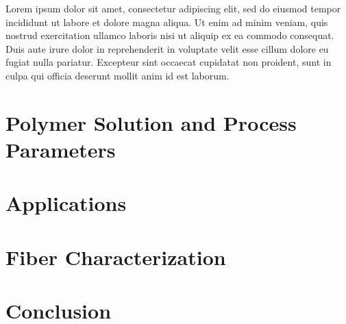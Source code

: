 \documentclass[3p,,preprint,12pt]{elsarticle}
\def\tblbottomrule{\noalign{\vspace*{6pt}}\hline\noalign{\vspace*{2pt}}}
\begin{document}
\begin{landscape}
\endgroup
\makeatletter{}\makeatother 
\end{landscape}
Lorem ipsum dolor sit amet, consectetur adipiscing elit, sed do eiusmod tempor incididunt ut labore et dolore magna aliqua. Ut enim ad minim veniam, quis nostrud exercitation ullamco laboris nisi ut aliquip ex ea commodo consequat. Duis aute irure dolor in reprehenderit in voluptate velit esse cillum dolore eu fugiat nulla pariatur. Excepteur sint occaecat cupidatat non proident, sunt in culpa qui officia deserunt mollit anim id est laborum.
    
\section{Polymer Solution and Process Parameters}

    
\section{Applications}

    
\section{Fiber Characterization}

    
\section{Conclusion}

    






\end{document}
